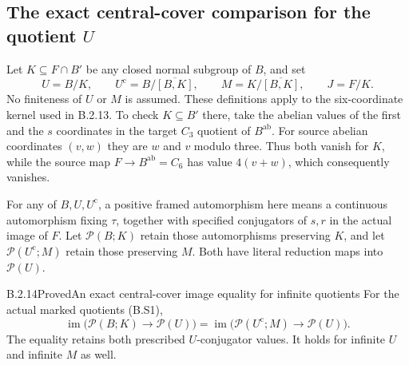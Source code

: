 \subsection{The exact central-cover comparison for the quotient $U$}

Let $K\subseteq F\cap B'$ be any closed normal subgroup
of $B$, and set
\[
 U=B/K,\qquad U^{\mathrm c}=B/\overline{[B,K]},\qquad
 M=K/\overline{[B,K]},\qquad J=F/K.                            \tag{B.S1}
\]
No finiteness of $U$ or $M$ is assumed.  These definitions
apply to the six-coordinate kernel used in B.2.13.  To check
$K\subseteq B'$ there, take the abelian values of the first
and the $s$ coordinates in the target $C_3$ quotient of
$B^{\mathrm{ab}}$.  For source abelian coordinates $(v,w)$
they are $w$ and $v$ modulo three.  Thus both vanish for
$K$, while the source map $F\to B^{\mathrm{ab}}=C_6$
has value $4(v+w)$, which consequently vanishes.

For any of $B,U,U^{\mathrm c}$, a positive framed
automorphism here means a continuous automorphism fixing
$\tau$, together with specified conjugators of $s,r$ in
the actual image of $F$.  Let $\mathscr P(B;K)$ retain
those automorphisms preserving $K$, and let
$\mathscr P(U^{\mathrm c};M)$ retain those preserving $M$.
Both have literal reduction maps into $\mathscr P(U)$.

\begin{result}{B.2.14}{Proved}{An exact central-cover image equality for infinite quotients}
For the actual marked quotients (B.S1),
\[
 \operatorname{im}\bigl(\mathscr P(B;K)\longrightarrow
                              \mathscr P(U)\bigr)
 =
 \operatorname{im}\bigl(\mathscr P(U^{\mathrm c};M)
                        \longrightarrow\mathscr P(U)\bigr).
                                                                  \tag{B.S2}
\]
The equality retains both prescribed $U$-conjugator values.
It holds for infinite $U$ and infinite $M$ as well.
\end{result}

